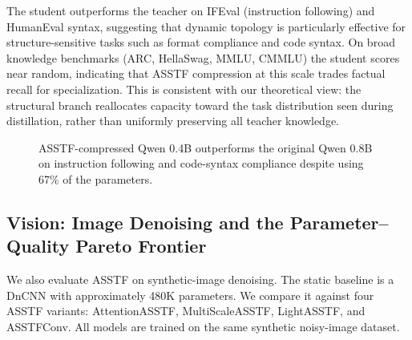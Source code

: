 \documentclass[11pt,a4paper]{article}
\theoremstyle{definition}
\begin{document}
The student outperforms the teacher on IFEval (instruction following) and HumanEval syntax, suggesting that dynamic topology is particularly effective for structure-sensitive tasks such as format compliance and code syntax. On broad knowledge benchmarks (ARC, HellaSwag, MMLU, CMMLU) the student scores near random, indicating that ASSTF compression at this scale trades factual recall for specialization. This is consistent with our theoretical view: the structural branch reallocates capacity toward the task distribution seen during distillation, rather than uniformly preserving all teacher knowledge.

\begin{figure}[t]
\centering
{}
\caption{ASSTF-compressed Qwen 0.4B outperforms the original Qwen 0.8B on instruction following and code-syntax compliance despite using 67\% of the parameters.}
\label{fig:llm}
\end{figure}

\subsection{Vision: Image Denoising and the Parameter--Quality Pareto Frontier}
\label{subsec:vision}

We also evaluate ASSTF on synthetic-image denoising. The static baseline is a DnCNN with approximately 480K parameters. We compare it against four ASSTF variants: AttentionASSTF, MultiScaleASSTF, LightASSTF, and ASSTFConv. All models are trained on the same synthetic noisy-image dataset.
\end{document}
